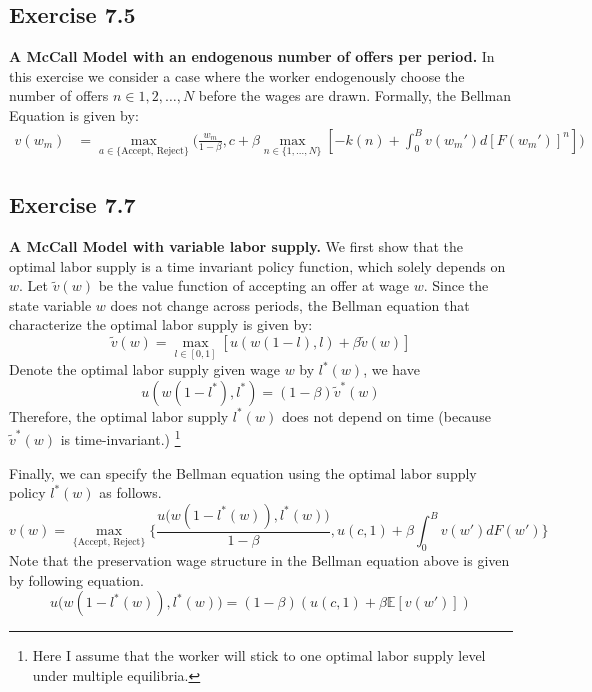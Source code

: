 \documentclass[11pt]{article}
\theoremstyle{definition}
\theoremstyle{boldtitle} %
\numberwithin{equation}{section}
\numberwithin{figure}{section}
\numberwithin{table}{section}
\begin{document}
\subsection{Exercise 7.5}
\textbf{A McCall Model with an endogenous number of offers per period.}
In this exercise we consider a case where the worker endogenously choose the number of offers $n \in 1, 2, \dots, N$
before the wages are drawn.
Formally, the Bellman Equation is given by:
\begin{align}
  v(w_m) & = \max_{a \in \{\text{Accept, Reject} \} } \bigg( \frac{w_m}{1 - \beta}, c + \beta  \max_{n \in \{1, \dots, N \}} \left[ -k(n) + \int_0^B v(w_m') d[F(w_m')]^n \right] \bigg)
\end{align}

\subsection{Exercise 7.7}
\textbf{A McCall Model with variable labor supply.}
We first show that the optimal labor supply is a time invariant policy function, which solely depends on $w$.
Let $\tilde{v}(w)$ be the value function of accepting an offer at wage $w$.
Since the state variable $w$ does not change across periods, the Bellman equation that characterize the optimal labor supply is given by:
\begin{equation}
  \tilde{v}(w) = \max_{l \in [0, 1]} [ u(w(1-l), l) + \beta \tilde{v}(w)]
\end{equation}
Denote the optimal labor supply given wage $w$ by $l^*(w)$, we have 
\[
u(w(1-l^*), l^*) = (1 - \beta) \tilde{v}^*(w)
\]
Therefore, the optimal labor supply $l^*(w)$ does not depend on time (because $\tilde{v}^*(w)$ is time-invariant.)%
\footnote{
  Here I assume that the worker will stick to one optimal labor supply level under multiple equilibria. 
}

Finally, we can specify the Bellman equation using the optimal labor supply policy $l^*(w)$ as follows.
\begin{equation}
  v(w) = \max_{\text{\{Accept, Reject\}}} \Bigg\{\frac{u \bigg(w(1-l^*(w)), l^*(w)\bigg)}{1 - \beta}, u(c, 1) + \beta \int_{0}^B v(w') dF(w') \bigg\}
\end{equation}
Note that the preservation wage structure in the Bellman equation above is given by following equation.
\begin{equation}
  u \bigg(w(1-l^*(w)), l^*(w)\bigg) = (1-\beta)(u(c,1) + \beta \mathbb{E}[v(w')])
\end{equation}
\end{document}
